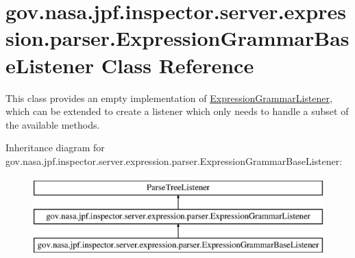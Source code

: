 \hypertarget{classgov_1_1nasa_1_1jpf_1_1inspector_1_1server_1_1expression_1_1parser_1_1_expression_grammar_base_listener}{}\section{gov.\+nasa.\+jpf.\+inspector.\+server.\+expression.\+parser.\+Expression\+Grammar\+Base\+Listener Class Reference}
\label{classgov_1_1nasa_1_1jpf_1_1inspector_1_1server_1_1expression_1_1parser_1_1_expression_grammar_base_listener}


This class provides an empty implementation of \hyperlink{interfacegov_1_1nasa_1_1jpf_1_1inspector_1_1server_1_1expression_1_1parser_1_1_expression_grammar_listener}{Expression\+Grammar\+Listener}, which can be extended to create a listener which only needs to handle a subset of the available methods.  


Inheritance diagram for gov.\+nasa.\+jpf.\+inspector.\+server.\+expression.\+parser.\+Expression\+Grammar\+Base\+Listener\+:\begin{figure}[H]
\begin{center}
\leavevmode
\includegraphics[height=3.000000cm]{classgov_1_1nasa_1_1jpf_1_1inspector_1_1server_1_1expression_1_1parser_1_1_expression_grammar_base_listener}
\end{center}
\end{figure}
